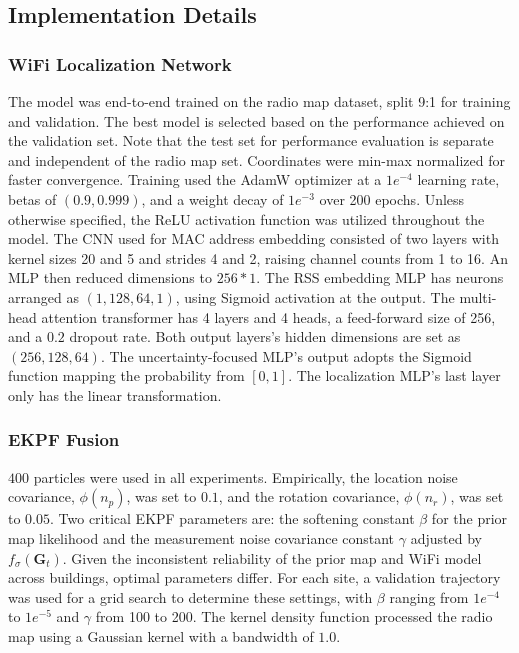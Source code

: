 \subsection{Implementation Details}

\subsubsection{WiFi Localization Network}
The model was end-to-end trained on the radio map dataset, split 9:1 for training and validation. The best model is selected based on the performance achieved on the validation set. Note that the test set for performance evaluation is separate and independent of the radio map set. Coordinates were min-max normalized for faster convergence. Training used the AdamW optimizer \cite{adamw2019decoupled} at a $1e^{-4}$ learning rate, betas of $(0.9, 0.999)$, and a weight decay of $1e^{-3}$ over 200 epochs. 
Unless otherwise specified, the ReLU\cite{relu2019deep} activation function was utilized throughout the model. The CNN used for MAC address embedding consisted of two layers with kernel sizes 20 and 5 and strides 4 and 2, raising channel counts from 1 to 16. An MLP then reduced dimensions to $256*1$.
The RSS embedding MLP has neurons arranged as $(1, 128, 64, 1)$, using Sigmoid activation at the output. The multi-head attention transformer has 4 layers and 4 heads, a feed-forward size of 256, and a $0.2$ dropout rate. Both output layers's hidden dimensions are set as $(256, 128, 64)$. The uncertainty-focused MLP's output adopts the Sigmoid function mapping the probability from $[0, 1]$. The localization MLP's last layer only has the linear transformation.

\subsubsection{EKPF Fusion}

$400$ particles were used in all experiments. Empirically, the location noise covariance, $\phi(n_p)$, was set to $0.1$, and the rotation covariance, $\phi(n_r)$, was set to $0.05$. Two critical EKPF parameters are: the softening constant $\beta$ for the prior map likelihood and the measurement noise covariance constant $\gamma$ adjusted by $f_{\sigma}(\mathbf{G}_t)$. Given the inconsistent reliability of the prior map and WiFi model across buildings, optimal parameters differ. For each site, a validation trajectory was used for a grid search to determine these settings, with $\beta$ ranging from $1e^{-4}$ to $1e^{-5}$ and $\gamma$ from 100 to 200. The kernel density function processed the radio map using a Gaussian kernel with a bandwidth of $1.0$.
